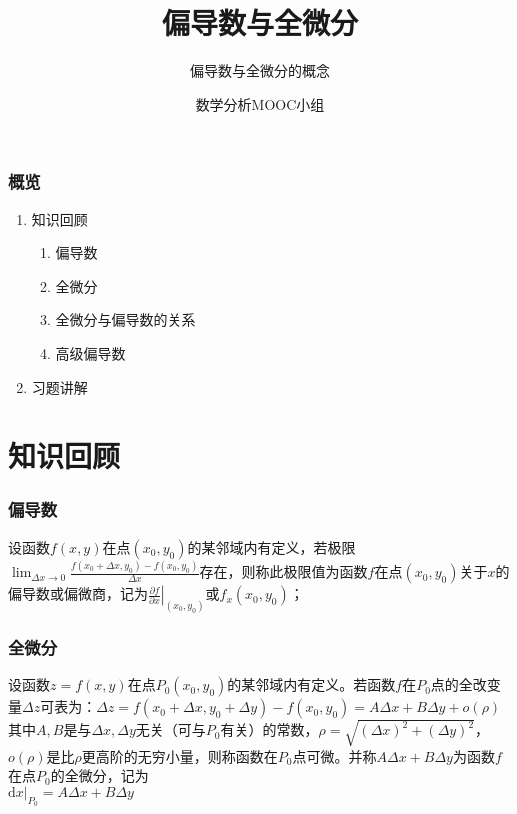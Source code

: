 \documentclass[xetex]{beamer}
\title{偏导数与全微分}
\subtitle{偏导数与全微分的概念}
\author{数学分析MOOC小组 }
\date{}
\begin{document}
\frame{\maketitle}

\begin{frame}
    \frametitle{概览}
	
    \begin{enumerate}
        \item 知识回顾
			\begin{enumerate}
           \item 偏导数
			\item 全微分
			\item 全微分与偏导数的关系
			\item 高级偏导数
        	\end{enumerate}
        \item 习题讲解
        
    \end{enumerate}


\end{frame}

\section{知识回顾}
\begin{frame}
    \frametitle{偏导数} 
  
设函数$f(x,y)$在点$(x_{0},y_{0})$的某邻域内有定义，若极限$\displaystyle\lim_{\Delta x \to 0}\frac{f(x_{0}+\Delta x,y_{0})-f(x_{0},y_{0})}{\Delta x}$存在，则称此极限值为函数$f$在点$(x_{0},y_{0})$关于$x$的偏导数或偏微商，记为$\displaystyle \left. \frac{\partial f}{\partial x} \right|_{(x_0, y_0)}$或$f_{x}(x_{0},y_{0})$；
	
	
\end{frame}

\begin{frame}
    \frametitle{全微分} 
 	 设函数$z=f(x,y)$在点$P_{0}(x_{0},y_{0})$的某邻域内有定义。若函数$f$在$P_{0}$点的全改变量$\Delta z$可表为：$\Delta z =f(x_{0}+\Delta x,y_{0}+\Delta y)-f(x_{0},y_{0})$$=A\Delta x +B\Delta y + o(\rho)$\\其中$A,B$是与$\Delta x,\Delta y$无关（可与$P_{0}$有关）的常数，$\rho = \sqrt{(\Delta x)^2+(\Delta y)^2}$，$o(\rho)$是比$\rho$更高阶的无穷小量，则称函数在$P_{0}$点可微。并称$A\Delta x+B\Delta y$为函数$f$在点$P_{0}$的全微分，记为\\$\displaystyle \left. \mathrm{d}x\right|_{P_{0}}=A\Delta x+B\Delta y$

\end{frame}
\end{document}
